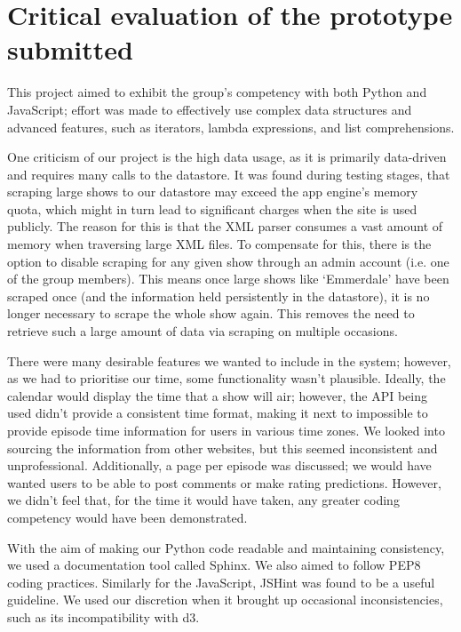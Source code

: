 \documentclass[12pt, a4paper]{article}
\begin{document}
\newpage	
\section{Critical evaluation of the prototype submitted}

This project aimed to exhibit the group's competency with both Python and JavaScript; effort was made to effectively use complex data structures and advanced features, such as iterators, lambda expressions, and list comprehensions.

One criticism of our project is the high data usage, as it is primarily data-driven and requires many calls to the datastore. It was found during testing stages, that scraping large shows to our datastore may exceed the app engine's memory quota, which might in turn lead to significant charges when the site is used publicly. The reason for this is that the XML parser consumes a vast amount of memory when traversing large XML files. To compensate for this, there is the option to disable scraping for any given show through an admin account (i.e. one of the group members). This means once large shows like `Emmerdale' have been scraped once (and the information held persistently in the datastore), it is no longer necessary to scrape the whole show again. This removes the need to retrieve such a large amount of data via scraping on multiple occasions.

There were many desirable features we wanted to include in the system; however, as we had to prioritise our time, some functionality wasn't plausible. Ideally, the calendar would display the time that a show will air; however, the API being used didn't provide a consistent time format, making it next to impossible to provide episode time information for users in various time zones. We looked into sourcing the information from other websites, but this seemed inconsistent and unprofessional. Additionally, a page per episode was discussed; we would have wanted users to be able to post comments or make rating predictions. However, we didn't feel that, for the time it would have taken, any greater coding competency would have been demonstrated. 

With the aim of making our Python code readable and maintaining consistency, we used a documentation tool called Sphinx. We also aimed to follow PEP8 coding practices. Similarly for the JavaScript, JSHint was found to be a useful guideline. We used our discretion when it brought up occasional inconsistencies, such as its incompatibility with d3.
\end{document}
